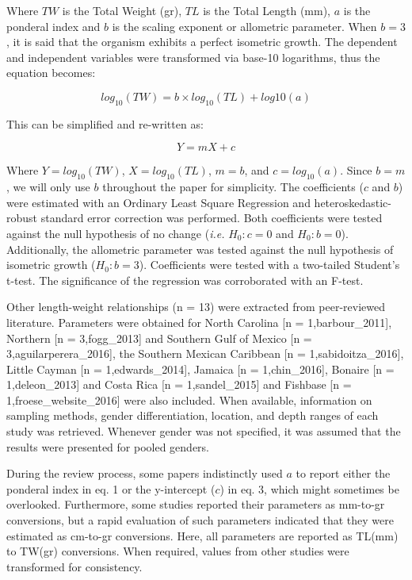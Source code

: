 \documentclass[fleqn,10pt,lineno]{wlpeerj} %
\theoremstyle{definition}
\theoremstyle{definition}
\theoremstyle{definition}
\theoremstyle{remark}
\begin{document}
Where \(TW\) is the Total Weight (gr), \(TL\) is the Total Length (mm),
\(a\) is the ponderal index and \(b\) is the scaling exponent or
allometric parameter. When \(b = 3\), it is said that the organism
exhibits a perfect isometric growth. The dependent and independent
variables were transformed via base-10 logarithms, thus the equation
becomes:

\begin{equation}
\label{eq:log-alo}
log_{10}(TW) = b\times log_{10}(TL) + log{10}(a)
\end{equation}

This can be simplified and re-written as:

\begin{equation}
\label{eq:log-alo-trans}
Y = mX + c
\end{equation}

Where \(Y = log_{10}(TW)\), \(X = log_{10}(TL)\), \(m = b\), and
\(c = log_{10}(a)\). Since \(b = m\), we will only use \(b\) throughout
the paper for simplicity. The coefficients (\(c\) and \(b\)) were
estimated with an Ordinary Least Square Regression and
heteroskedastic-robust standard error correction was performed. Both
coefficients were tested against the null hypothesis of no change
(\emph{i.e.} \(H_0: c = 0\) and \(H_0: b = 0\)). Additionally, the
allometric parameter was tested against the null hypothesis of isometric
growth (\(H_0: b = 3\)). Coefficients were tested with a two-tailed
Student's t-test. The significance of the regression was corroborated
with an F-test.

Other length-weight relationships (n = 13) were extracted from
peer-reviewed literature. Parameters were obtained for North Carolina
{[}n = 1,barbour\_2011{]}, Northern {[}n = 3,fogg\_2013{]} and Southern
Gulf of Mexico {[}n = 3,aguilarperera\_2016{]}, the Southern Mexican
Caribbean {[}n = 1,sabidoitza\_2016{]}, Little Cayman {[}n =
1,edwards\_2014{]}, Jamaica {[}n = 1,chin\_2016{]}, Bonaire {[}n =
1,deleon\_2013{]} and Costa Rica {[}n = 1,sandel\_2015{]} and Fishbase
{[}n = 1,froese\_website\_2016{]} were also included. When available,
information on sampling methods, gender differentiation, location, and
depth ranges of each study was retrieved. Whenever gender was not
specified, it was assumed that the results were presented for pooled
genders.

During the review process, some papers indistinctly used \(a\) to report
either the ponderal index in eq. 1 or the y-intercept (\(c\)) in eq. 3,
which might sometimes be overlooked. Furthermore, some studies reported
their parameters as mm-to-gr conversions, but a rapid evaluation of such
parameters indicated that they were estimated as cm-to-gr conversions.
Here, all parameters are reported as TL(mm) to TW(gr) conversions. When
required, values from other studies were transformed for consistency.
\end{document}
